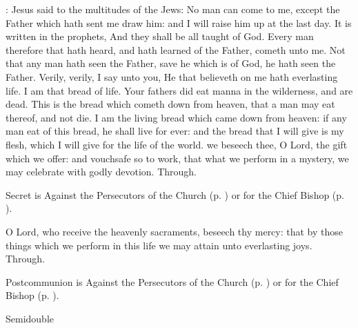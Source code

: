 : Jesus said to the multitudes of the Jews: No man can come to me, except the Father which hath sent me draw him: and I will raise him up at the last day. It is written in the prophets, And they shall be all taught of God. Every man therefore that hath heard, and hath learned of the Father, cometh unto me. Not that any man hath seen the Father, save he which is of God, he hath seen the Father. Verily, verily, I say unto you, He that believeth on me hath everlasting life. I am that bread of life. Your fathers did eat manna in the wilderness, and are dead. This is the bread which cometh down from heaven, that a man may eat thereof, and not die. I am the living bread which came down from heaven: if any man eat of this bread, he shall live for ever: and the bread that I will give is my flesh, which I will give for the life of the world.
\secret
{} we beseech thee, O Lord, the gift which we offer: and vouchsafe so to work, that what we perform in a mystery, we may celebrate with godly devotion. Through.
\begin{rubric}
     Secret is Against the Persecutors of the Church (p. \pageref{SPAgainst}) or for the Chief Bishop (p. \pageref{SPChiefBishop}).
\end{rubric}
\postcommunion
{} O Lord, who receive the heavenly sacraments, beseech thy mercy: that by those things which we perform in this life we may attain unto everlasting joys. Through.
\begin{rubric}
     Postcommunion is Against the Persecutors of the Church (p. \pageref{SPAgainst}) or for the Chief Bishop (p. \pageref{SPChiefBishop}).
\end{rubric}

\clearpage

\begin{inhead}
    {Semidouble}
\end{inhead}
\fancyhead[RE,LO]{}

\properantiphonfix


